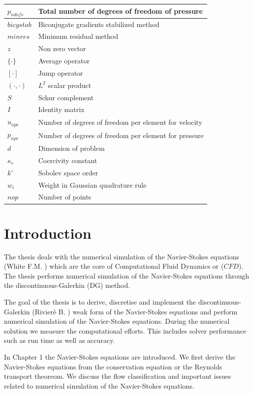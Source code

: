 \documentclass[a4paper,twoside,openright]{book}
\begin{document}
\begin{longtable}{| p{} | p{} |}
$p_{ndofs}$ & Total number of degrees of freedom of pressure\\
\hline
$bicgstab$ & Biconjugate gradients stabilized method\\
\hline
$minres$ & Minimum residual method\\
\hline
$z$ & Non zero vector\\
\hline
$\lbrace \cdot \rbrace$ & Average operator\\
\hline
$[\cdot]$ & Jump operator\\
\hline
$(\cdot,\cdot)$ & $L^2$ scalar product\\
\hline
$S$ & Schur complement\\
\hline
$I$ & Identity matrix\\
\hline
$u_{npe}$ & Number of degrees of freedom per element for velocity\\
\hline
$p_{npe}$ & Number of degrees of freedom per element for pressure\\
\hline
$d$ & Dimension of problem\\
\hline
$\kappa_e$ & Coercivity constant\\
\hline
$k'$ & Sobolev space order\\
\hline
$w_i$ & Weight in Gaussian quadrature rule\\
\hline
$nop$ & Number of points\\
\hline
\end{longtable}
\listoffigures
\listoftables

\tableofcontents

\chapter*{Introduction}

The thesis deals with the numerical simulation of the Navier-Stokes equations (White F.M. \cite{white}) which are the core of Computational Fluid Dynamics or ($CFD$). The thesis performs numerical simulation of the Navier-Stokes equations through the discontinuous-Galerkin (DG) method.

The goal of the thesis is to derive, discretise and implement the discontinuous- Galerkin (Rivier\`e B. \cite{riviere}) weak form of the Navier-Stokes equations and perform numerical simulation of the Navier-Stokes equations. During the numerical solution we measure the computational efforts. This includes solver performance such as run time as well as accuracy.

In Chapter 1 the Navier-Stokes equations are introduced. We first derive the Navier-Stokes equations from the conservation equation or the Reynolds transport theoreom. We discuss the flow classification and important issues related to numerical simulation of the Navier-Stokes equations. 
\end{document}
